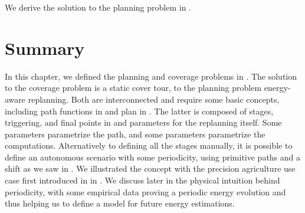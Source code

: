 We derive the solution to the planning problem in .


\section{Summary}

In this chapter, we defined the planning and coverage problems in . The solution to the coverage problem is a static cover tour, to the planning problem energy-aware replanning. Both are interconnected and require some basic concepts, including path functions in  and plan in . The latter is composed of stages, triggering, and final points in  and parameters for the replanning itself. Some parameters parametrize the path, and some parameters parametrize the computations. 
Alternatively to defining all the stages manually, it is possible to define an autonomous scenario with some periodicity, using primitive paths and a shift as we saw in . We illustrated the concept with the precision agriculture use case first introduced in  in . We discuss later in  the physical intuition behind periodicity, with some empirical data proving a periodic energy evolution and thus helping us to define a model for future energy estimations.


